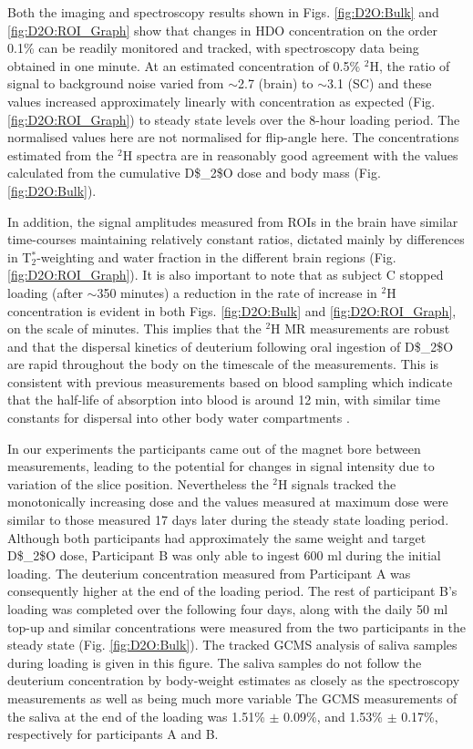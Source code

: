 Both the imaging and spectroscopy results shown in Figs. \ref{fig:D2O:Bulk} and \ref{fig:D2O:ROI_Graph} show that changes in \ac{HDO} concentration on the order 0.1\% can be readily monitored and tracked, with spectroscopy data being obtained in one minute. At an estimated concentration of 0.5\% $^2$H, the ratio of signal to background noise varied from $\sim$2.7 (brain) to $\sim$3.1 (\ac{SC}) and these values increased approximately linearly with concentration as expected (Fig. \ref{fig:D2O:ROI_Graph}) to steady state levels over the 8-hour loading period. The normalised values here are not normalised for flip-angle here. The concentrations estimated from the $^2$H spectra are in reasonably good agreement with the values calculated from the cumulative \ac{D$_2$O} dose and body mass (Fig. \ref{fig:D2O:Bulk}). 

In addition, the signal amplitudes measured from \ac{ROI}s in the brain have similar time-courses maintaining relatively constant ratios, dictated mainly by differences in T$_2^*$-weighting and water fraction in the different brain regions (Fig. \ref{fig:D2O:ROI_Graph}). It is also important to note that as subject C stopped loading (after $\sim$350 minutes) a reduction in the rate of increase in $^2$H concentration is evident in both Figs. \ref{fig:D2O:Bulk} and \ref{fig:D2O:ROI_Graph}, on the scale of minutes. This implies that the $^2$H MR measurements are robust and that the dispersal kinetics of deuterium following oral ingestion of \ac{D$_2$O} are rapid throughout the body on the timescale of the measurements. This is consistent with previous measurements based on blood sampling which indicate that the half-life of absorption into blood is around 12 min, with similar time constants for dispersal into other body water compartments \cite{Davies2001RapidWater,Peronnet2012PharmacokineticHumans}. 

In our experiments the participants came out of the magnet bore between measurements, leading to the potential for changes in signal intensity due to variation of the slice position. Nevertheless the $^2$H signals tracked the monotonically increasing dose and the values measured at maximum dose were similar to those measured 17 days later during the steady state loading period. Although both participants had approximately the same weight and target \ac{D$_2$O} dose, Participant B was only able to ingest 600 ml during the initial loading. The deuterium concentration measured from Participant A was consequently higher at the end of the loading period. The rest of participant B’s loading was completed over the following four days, along with the daily 50 ml top-up and similar concentrations were measured from the two participants in the steady state (Fig. \ref{fig:D2O:Bulk}). The tracked GCMS analysis of saliva samples during loading is given in this figure. The saliva samples do not follow the deuterium concentration by body-weight estimates as closely as the spectroscopy measurements as well as being much more variable  The GCMS measurements of the saliva at the end of the loading was 1.51\% $\pm$ 0.09\%, and 1.53\% $\pm$ 0.17\%, respectively for participants A and B. 

